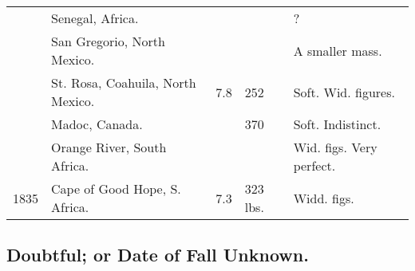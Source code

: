 \documentclass[a4paper, 12pt, oneside]{article}
\begin{document}
\begin{center}
\begin{longtable}{|p{16mm}|p{34mm}|p{10mm}|p{12mm}|p{40mm}|}
        ~ & Senegal, Africa. & ~ & ~ & ? \\
        ~ & San Gregorio, North Mexico. & ~ & ~ & A smaller mass. \\
        ~ & St. Rosa, Coahuila, North Mexico. & 7.8 & 252 & Soft. Wid. figures. \\
        ~ & Madoc, Canada. & ~ & 370 & Soft. Indistinct. \\
        ~ & Orange River, South Africa. & ~ & ~ & Wid. figs. Very perfect. \\
        1835 & Cape of Good Hope, S. Africa. & 7.3 & 323 lbs. & Widd. figs. \\ \hline
    \end{longtable}
\end{center}
\clearpage
\subsection{Doubtful; or Date of Fall Unknown.}
\end{document}
